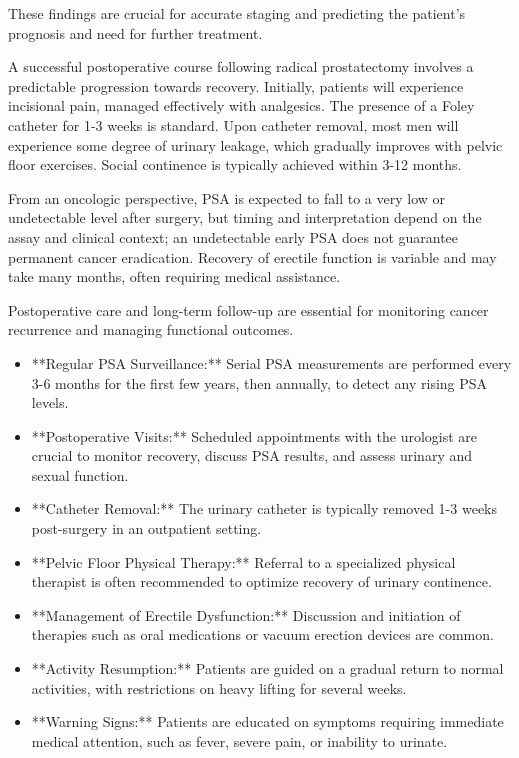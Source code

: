 These findings are crucial for accurate staging and predicting the patient's prognosis and need for further treatment.

A successful postoperative course following radical prostatectomy involves a predictable progression towards recovery. Initially, patients will experience incisional pain, managed effectively with analgesics. The presence of a Foley catheter for 1-3 weeks is standard. Upon catheter removal, most men will experience some degree of urinary leakage, which gradually improves with pelvic floor exercises. Social continence is typically achieved within 3-12 months.

From an oncologic perspective, PSA is expected to fall to a very low or undetectable level after surgery, but timing and interpretation depend on the assay and clinical context; an undetectable early PSA does not guarantee permanent cancer eradication. Recovery of erectile function is variable and may take many months, often requiring medical assistance.

Postoperative care and long-term follow-up are essential for monitoring cancer recurrence and managing functional outcomes.

\begin{itemize}
  \item **Regular PSA Surveillance:** Serial PSA measurements are performed every 3-6 months for the first few years, then annually, to detect any rising PSA levels.
  
  \item **Postoperative Visits:** Scheduled appointments with the urologist are crucial to monitor recovery, discuss PSA results, and assess urinary and sexual function.
  
  \item **Catheter Removal:** The urinary catheter is typically removed 1-3 weeks post-surgery in an outpatient setting.
  
  \item **Pelvic Floor Physical Therapy:** Referral to a specialized physical therapist is often recommended to optimize recovery of urinary continence.
  
  \item **Management of Erectile Dysfunction:** Discussion and initiation of therapies such as oral medications or vacuum erection devices are common.
  
  \item **Activity Resumption:** Patients are guided on a gradual return to normal activities, with restrictions on heavy lifting for several weeks.
  
  \item **Warning Signs:** Patients are educated on symptoms requiring immediate medical attention, such as fever, severe pain, or inability to urinate.
\end{itemize}

